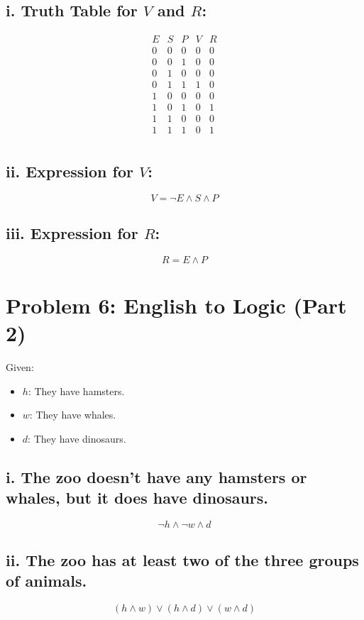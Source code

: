 \documentclass{article}
\begin{document}
\subsection*{i. Truth Table for $V$ and $R$:}

\[
\begin{array}{|c|c|c|c|c|}
E & S & P & V & R \\
\hline
0 & 0 & 0 & 0 & 0 \\
0 & 0 & 1 & 0 & 0 \\
0 & 1 & 0 & 0 & 0 \\
0 & 1 & 1 & 1 & 0 \\
1 & 0 & 0 & 0 & 0 \\
1 & 0 & 1 & 0 & 1 \\
1 & 1 & 0 & 0 & 0 \\
1 & 1 & 1 & 0 & 1 \\
\end{array}
\]

\subsection*{ii. Expression for $V$:}
\[
V = \neg E \land S \land P
\]

\subsection*{iii. Expression for $R$:}
\[
R = E \land P
\]
\newpage

\section*{Problem 6: English to Logic (Part 2)}

Given:
\begin{itemize}
    \item $h$: They have hamsters.
    \item $w$: They have whales.
    \item $d$: They have dinosaurs.
\end{itemize}

\subsection*{i. The zoo doesn’t have any hamsters or whales, but it does have dinosaurs.}
\[
\neg h \land \neg w \land d
\]

\subsection*{ii. The zoo has at least two of the three groups of animals.}
\[
(h \land w) \lor (h \land d) \lor (w \land d)
\]
\end{document}
